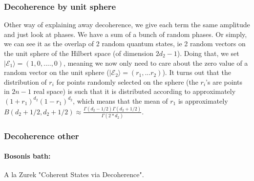 \documentclass{article}
\begin{document}
\subsubsection{Decoherence by unit sphere}
Other way of explaining away decoherence, we give each term the same amplitude and just look at phases. We have a sum of a bunch of random phases. Or simply, we can see it as the overlap of 2 random quantum states, ie 2 random vectors on the unit sphere of the Hilbert space (of dimension $2d_2-1$). Doing that, we set $|\mathcal{E}_1\rangle=(1,0,....,0)$, meaning we now only need to care about the zero value of a random vector on the unit sphere ($|\mathcal{E}_2\rangle=(r_1, ...r_2)$). It turns out that the distribution of $r_i$ for points randomly selected on the sphere (the $r_i$'s are points in $2n-1$ real space) is such that it is distributed according to approximately $(1+r_1)^{d_2}(1-r_1)^{d_2}$, which means that the mean of $r_1$ is approximately $B(d_2+1/2,d_2+1/2)\approx\frac{\Gamma(d_2-1/2)\Gamma(d_2+1/2)}{\Gamma(2*d_2)}$.


\subsubsection{Decoherence other}
\paragraph{Bosonis bath:} A la Zurek "Coherent States via Decoherence". 
\begin{comment}
We find pointer states $|q_1\rangle = (\hat{a}^{\dagger})^{q_1}|0\rangle$, not a coherent state/  Note that this goes against what Andreas is saying, which is that we have position eigenstaes as pointer states, which would be $b(\hat{a}^{\dagger}+\hat{a})$. ( Zurek's paper Coherent States via Decoherence) (does my paper go against this?). 
\end{comment}

\begin{comment}
    A coherent state is the specific quantum state of the quantum harmonic oscillator, often described as a state that has dynamics most closely resembling the oscillatory behavior of a classical harmonic oscillator.Mathematically, a coherent state is defined to be the (unique) eigenstate of the annihilation operator â.
    This leads me to a confusion. I am starting my state in a superposition of 2 eigenstates of the SHO. The $|q_i\rangle$'s are not position states but coherent states, ie eigenstates of the SHO ie eigenstates of $\hat{a}\hat{a^{\dagger}}$. So as Zurek says, the ACL model leads in its non-trivial limit, to pointer states that are coherent states.
\end{comment}
\end{document}
